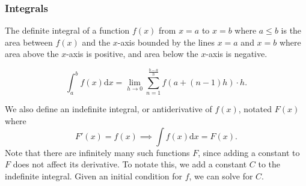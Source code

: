 \subsubsection{Integrals}
The definite integral of a function $f(x)$ from $x=a$ to $x=b$ where $a \leq b$ is the area between $f(x)$ and the $x$-axis bounded by the lines $x=a$ and $x=b$ where area above the $x$-axis is positive, and area below the $x$-axis is negative. 
\begin{definition}
	\begin{equation*}
		\int_{a}^{b}{f(x) \mathrm{d}x} = \lim\limits_{h \to 0}{\sum_{n=1}^{\frac{b-a}{h}}}{f(a + (n-1)h) \cdot h}.
	\end{equation*}
\end{definition}

\noindent
We also define an indefinite integral, or antiderivative of $f(x)$, notated $F(x)$ where
\begin{equation*}
F'(x) = f(x) \implies \int{f(x)\mathrm{d}x} = F(x).
\end{equation*}
Note that there are infinitely many such functions $F$, since adding a constant to $F$ does not affect its derivative. To notate this, we add a constant $C$ to the indefinite integral. Given an initial condition for $f$, we can solve for $C$.\\

